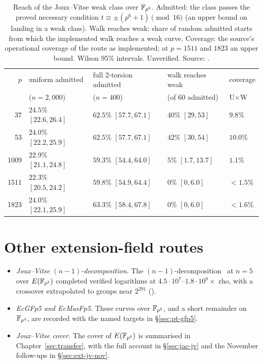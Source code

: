 \begin{table}[t]
\centering\small
\begin{tabular}{@{}rllll@{}}
\toprule
$p$ & uniform admitted & full 2-torsion admitted & walk reaches weak & coverage \\
 & ($n=2{,}000$) & ($n=400$) & (of 60 admitted) & U$\times$W \\
\midrule
37 & $24.5\%$ $[22.6,26.4]$ & $62.5\%$ $[57.7,67.1]$ & $40\%$ $[29,53]$ & $9.8\%$ \\
53 & $24.0\%$ $[22.2,25.9]$ & $62.5\%$ $[57.7,67.1]$ & $42\%$ $[30,54]$ & $10.0\%$ \\
1009 & $22.9\%$ $[21.1,24.8]$ & $59.3\%$ $[54.4,64.0]$ & $5\%$ $[1.7,13.7]$ & $1.1\%$ \\
1511 & $22.3\%$ $[20.5,24.2]$ & $59.8\%$ $[54.9,64.4]$ & $0\%$ $[0,6.0]$ & $<1.5\%$ \\
1823 & $24.0\%$ $[22.1,25.9]$ & $63.3\%$ $[58.4,67.8]$ & $0\%$ $[0,6.0]$ & $<1.6\%$ \\
\bottomrule
\end{tabular}
\caption[]{Reach of the Joux--Vitse weak class over $\mathbb{F}_{p^6}$. Admitted:
the class passes the proved necessary condition $t\equiv\pm(p^6+1)
\pmod{16}$ (an upper bound on landing in a weak class). Walk reaches weak:
share of random admitted starts from which the implemented walk reaches a
weak curve. Coverage: the source's operational coverage of the route as
implemented; at $p=1511$ and $1823$ an upper bound. Wilson 95\% intervals.
Unverified. Source: .}
\label{tab:ext-jv-coverage}
\end{table}

\section{Other extension-field routes}

\begin{itemize}
\item \emph{Joux--Vitse $(n-1)$-decomposition.} The
  $(n-1)$-decomposition~\cite{jouxvitse2012} at $n=5$ over $E(\mathbb{F}_{p^5})$
  completed verified logarithms at $4.5\cdot10^7$--$1.8\cdot10^8\times$ rho,
  with a crossover extrapolated to groups near $2^{291}$
  ().
\item \emph{EcGFp5 and EcMasFp5.} These curves over $\mathbb{F}_{p^5}$, and a
  short remainder on $\mathbb{F}_{p^4}$, are recorded with the named targets in
  \S\ref{sec:pt-gfp5}.
\item \emph{Joux--Vitse cover.} The cover of $E(\mathbb{F}_{p^6})$ is summarised in
  Chapter~\ref{sec:transfer}, with the full account in \S\ref{sec:jac-jv}
  and the November follow-ups in \S\ref{sec:ext-jv-nov}.
\end{itemize}
